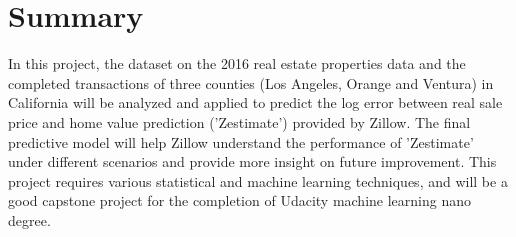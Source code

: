 \documentclass[12pt]{article}
\begin{document}
\section{Summary}\label{sec:summary}
In this project, the dataset on the 2016 real estate properties data and the completed transactions of three counties (Los Angeles, Orange and Ventura) in California will be analyzed and applied to predict the log error between real sale price and home value prediction ('Zestimate') provided by Zillow. The final predictive model will help Zillow understand the performance of 'Zestimate' under different scenarios and provide more insight on future improvement. This project requires various statistical and machine learning techniques, and will be a good capstone project for the completion of Udacity machine learning nano degree.      

%
%
\end{document}
